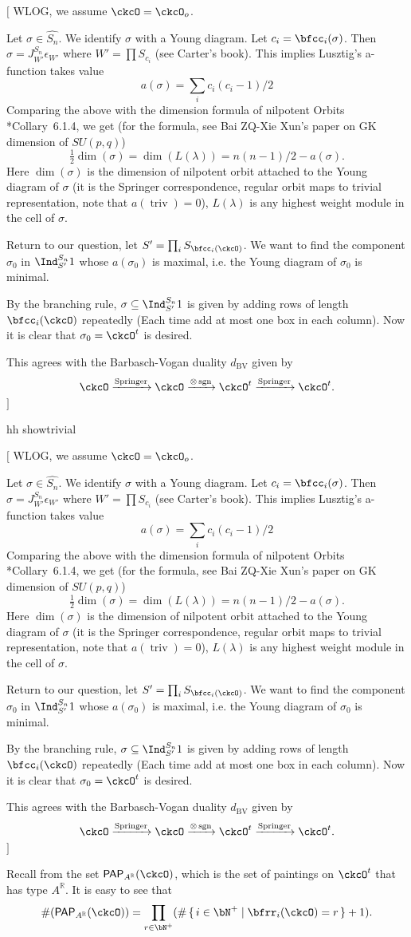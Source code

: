 \documentclass[12pt,a4paper]{amsart}
\newcommand{\trivial}[2][]{\if\relax\detokenize{#1}\relax
  {%
      \color{orange} \vspace{0em} $[$  #2 $]$
      \color{black}
  }
  \else
\ifx#1h
\ifcsname showtrivial\endcsname
{%
    \color{orange} \vspace{0em}  $[$ #2 $]$
    \color{black}
}
\fi
\else {\red Wrong argument!} \fi
\fi
}
\def\subset{\subseteq}
\def\Im{\operatorname{Im}}
\def\abs#1{\left|{#1}\right|}
\newcommand{\sgn}{\operatorname{sgn}}
\newcommand{\triv}{\operatorname{triv}}
\newcommand{\R}{\mathbb R}
\numberwithin{equation}{section}
\theoremstyle{remark}
\def\half{{\tfrac{1}{2}}}
\def\dBV{d_{\mathrm{BV}}}
\def\lamck{\lambda_\ckcO}
\def\Wint#1{W_{[#1]}}
\def\PP{\mathsf{PAP}}
\def\Im{\mathrm{Im}}
\def\Spr{\mathrm{Springer}}
\begin{document}
\trivial[h]{ WLOG, we assume $\ckcO = \ckcO_o$.

  Let $\sigma\in \widehat{S_n}$. We identify $\sigma$ with a Young diagram. Let
  $c_i = \bfcc_i(\sigma)$. Then $\sigma = J^{S_n}_{W'} \epsilon_{W'}$ where
  $W' = \prod S_{c_i}$ (see Carter's book). This implies Lusztig's a-function
  takes value
  \[
    a(\sigma) = \sum_i c_i(c_i-1) /2
  \]
  Comparing the above with the dimension formula of nilpotent Orbits
  \cite{CM}*{Collary~6.1.4}, we get (for the formula, see Bai ZQ-Xie Xun's paper
  on GK dimension of $SU(p,q)$)
  \[
    \half \dim(\sigma) = \dim(L(\lambda)) = n(n-1)/2 - a(\sigma).
  \]
  Here $\dim(\sigma)$ is the dimension of nilpotent orbit attached to the Young
  diagram of $\sigma$ (it is the Springer correspondence, regular orbit maps to
  trivial representation, note that $a(\triv)=0$), $L(\lambda)$ is any highest
  weight module in the cell of $\sigma$.


  Return to our question, let $S' = \prod_i S_{\bfcc_i(\ckcO)}$. We want to find
  the component $\sigma_0$ in $\Ind_{S'}^{S_n} 1$ whose $a(\sigma_0)$ is
  maximal, i.e. the Young diagram of $\sigma_0$ is minimal.

  By the branching rule, $\sigma \subset \Ind_{S'}^{S_n} 1$ is given by adding
  rows of length $\bfcc_i(\ckcO)$ repeatedly (Each time add at most one box in
  each column). Now it is clear that $\sigma_0 = \ckcO^t$ is desired.

  This agrees with the Barbasch-Vogan duality $\dBV$ given by
  \[
    \ckcO \xrightarrow{\Spr}\ckcO \xrightarrow{\otimes \sgn} \ckcO^t \xrightarrow{\Spr} \ckcO^t.
  \]
}

Recall from  the set $\PP_{A^\R}(\ckcO)$, which is the set of paintings on $\ckcO^{t}$ that has type $A^\R$.
It is easy to see that
\begin{equation}\label{eq:PPA.count}
  \#(\PP_{A^\R}(\ckcO)) = \prod_{r\in \bN^{+}} (\#\set{i\in \bN^{+}| \bfrr_{i}(\ckcO)=r}+1).
\end{equation}
\end{document}
